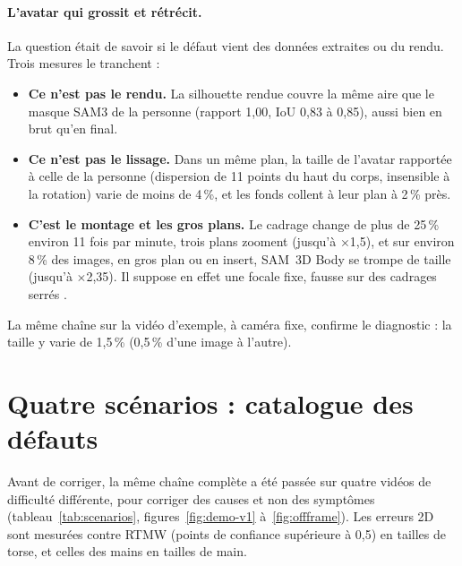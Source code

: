 \documentclass[11pt,a4paper]{report}
\begin{document}
\paragraph{L'avatar qui grossit et rétrécit.} La question était de savoir si le défaut vient des données extraites ou du rendu. Trois
mesures le tranchent :
\begin{itemize}
    \item \textbf{Ce n'est pas le rendu.} La silhouette rendue couvre la même aire que le masque SAM3 de la personne (rapport 1,00, IoU
    0,83 à 0,85), aussi bien en brut qu'en final.
    \item \textbf{Ce n'est pas le lissage.} Dans un même plan, la taille de l'avatar rapportée à celle de la personne (dispersion de
    11 points du haut du corps, insensible à la rotation) varie de moins de 4\,\%, et les fonds collent à leur plan à 2\,\% près.
    \item \textbf{C'est le montage et les gros plans.} Le cadrage change de plus de 25\,\% environ 11 fois par minute, trois plans
    zooment (jusqu'à $\times$1,5), et sur environ 8\,\% des images, en gros plan ou en insert, SAM~3D Body se trompe de taille
    (jusqu'à $\times$2,35). Il suppose en effet une focale fixe, fausse sur des cadrages serrés \cite{hao2025perspose}.
\end{itemize}
La même chaîne sur la vidéo d'exemple, à caméra fixe, confirme le diagnostic : la taille y varie de 1,5\,\% (0,5\,\% d'une image à
l'autre).

\section{Quatre scénarios : catalogue des défauts}
\label{sec:res-scenarios}

Avant de corriger, la même chaîne complète a été passée sur quatre vidéos de difficulté différente, pour corriger des causes et non
des symptômes (tableau~\ref{tab:scenarios}, figures~\ref{fig:demo-v1} à~\ref{fig:offframe}). Les erreurs 2D sont mesurées contre RTMW
(points de confiance supérieure à 0,5) en tailles de torse, et celles des mains en tailles de main.
\end{document}
